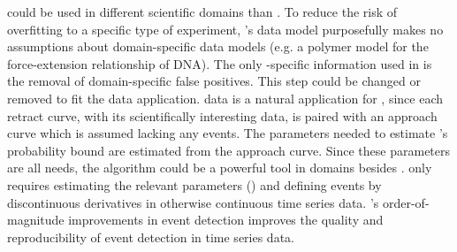 \name{} could be used in different scientific domains than \singlemol{}. To reduce the risk of overfitting to a specific type of \singlemol{} experiment, \name{}'s data model purposefully makes no assumptions about domain-specific data models (e.g. a polymer model for the force-extension relationship of DNA). The only \singlemol{}-specific information used in \name{} is the removal of domain-specific false positives. This step could be changed or removed to fit the data application. \singlemol{} data is a natural application for \name{}, since each retract curve, with its scientifically interesting data, is paired with an approach curve which is assumed lacking any events. The parameters needed to estimate \name{}'s probability bound are estimated from the approach curve. Since these parameters are all \name{} needs, the algorithm could be a powerful tool in domains besides \singlemol{}. \name{} only requires estimating the relevant parameters () and defining events by discontinuous derivatives in otherwise continuous time series data. \name{}'s order-of-magnitude improvements in event detection improves the quality and reproducibility of event detection in time series data.
